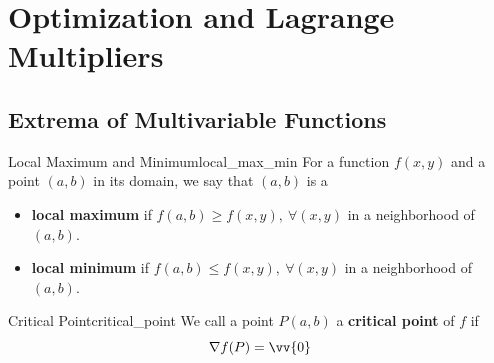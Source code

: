 \section{Optimization and Lagrange Multipliers}
\subsection{Extrema of Multivariable Functions}

\begin{definition}{Local Maximum and Minimum}{local_max_min}
For a function $f(x, y)$ and a point $(a, b)$ in its domain, we say that $(a, b)$ is a 
\begin{itemize}
    \item \textbf{local maximum} if $f(a, b) \geq f(x, y),\ \forall (x, y)$ in a neighborhood of $(a, b)$.
    \item \textbf{local minimum} if $f(a, b) \leq f(x, y),\ \forall (x, y)$ in a neighborhood of $(a, b)$.
\end{itemize}
\end{definition}

\begin{figure}[htbp]
\centering
\begin{minipage}{0.48\textwidth}
\centering
{}
\end{minipage}%
\end{figure}

\begin{definition}{Critical Point}{critical_point}
We call a point $P(a, b)$ a \textbf{critical point} of $f$ if
\[
\nabla f(P) = \vv{0}
\]
\end{definition}

